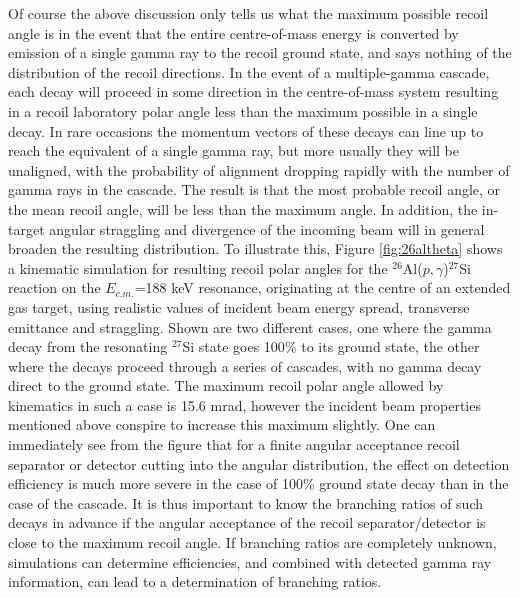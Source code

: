Of course the above discussion only tells us what the maximum possible recoil angle is in the event that the entire centre-of-mass energy is converted by emission of a single gamma ray to the recoil ground state, and says nothing of the distribution of the recoil directions. In the event of a multiple-gamma cascade, each decay will proceed in some direction in the centre-of-mass system resulting in a recoil laboratory polar angle less than the maximum possible in a single decay. In rare occasions the momentum vectors of these decays can line up to reach the equivalent of a single gamma ray, but more usually they will be unaligned, with the probability of alignment dropping rapidly with the number of gamma rays in the cascade. The result is that the most probable recoil angle, or the mean recoil angle, will be less than the maximum angle. In addition, the in-target angular straggling and divergence of the incoming beam will in general broaden the resulting distribution.
To illustrate this, Figure \ref{fig:26altheta} shows a kinematic simulation for resulting recoil polar angles for the $^{26}$Al($p,\gamma$)$^{27}$Si reaction on the $E_{c.m.}$=188 keV resonance, originating at the centre of an extended gas target, using realistic values of incident beam energy spread, transverse emittance and straggling. Shown are two different cases, one where the gamma decay from the resonating $^{27}$Si state goes 100$\%$ to its ground state, the other where the decays proceed through a series of cascades, with no gamma decay direct to the ground state. The maximum recoil polar angle allowed by kinematics in such a case is 15.6 mrad, however the incident beam properties mentioned above conspire to increase this maximum slightly. 
One can immediately see from the figure that for a finite angular acceptance recoil separator or detector cutting into the angular distribution, the effect on detection efficiency is much more severe in the case of 100\% ground state decay than in the case of the cascade. It is thus important to know the branching ratios of such decays in advance if the angular acceptance of the recoil separator/detector is close to the maximum recoil angle. If branching ratios are completely unknown, simulations can determine efficiencies, and combined with detected gamma ray information, can lead to a determination of branching ratios.    

